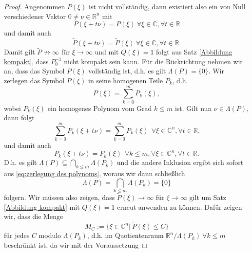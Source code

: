 \begin{proof}
Angenommen $P(\xi)$ ist nicht vollständig, dann existiert also ein von Null verschiedener Vektor $0 \not = \nu \in \mathbb{R}^n$ mit
\begin{equation}
P(\xi + t \nu)  = P(\xi) \ \forall \xi \in \mathbb{C}, \forall t \in \mathbb{R}
\end{equation}
und damit auch 
\begin{equation}
\widetilde{P}(\xi + t \nu) = \widetilde{P}(\xi) \ \forall \xi \in \mathbb{C}, \forall t \in \mathbb{R}.
\end{equation}
Damit gilt  $\widetilde{P} \not \rightarrow \infty$ für $\xi \rightarrow \infty$ und mit $Q(\xi) = 1$ folgt aus Satz \ref{Abbildung kompakt}, dass $P_0^{-1}$ nicht kompakt sein kann. Für die Rückrichtung nehmen wir an, dass das Symbol $P(\xi)$ vollständig ist, d.h. es gilt $\Lambda (P)= \{0\}$. Wir zerlegen das Symbol $P(\xi)$ in seine homogenen Teile $P_k$, d.h.
\begin{equation}\label{eq:zerlegung des polynoms}
P(\xi) = \sum_{k=0}^m P_k(\xi),
\end{equation}
wobei $P_k(\xi)$ ein homogenes Polynom vom Grad $k \leq m$ ist.
Gilt nun $\nu \in \Lambda (P)$, dann folgt
\begin{equation}
\sum_{k=0}^m P_k (\xi + t \nu) = \sum_{k=0}^m P_k (\xi) \ \  \forall \xi \in \mathbb{C}^n, \forall t \in \mathbb{R}.
\end{equation}
und damit auch
\begin{equation}
P_k (\xi + t \nu) = P_k (\xi) \ \ \forall k \leq m,  \forall \xi \in \mathbb{C}^n, \forall t \in \mathbb{R}.
\end{equation}
D.h. es gilt $\Lambda(P) \subseteq \bigcap_{k \leq m} \Lambda (P_k)$ und die andere Inklusion ergibt sich sofort aus \eqref{eq:zerlegung des polynoms}, woraus wir dann schließlich
\begin{equation}\label{eq:schnitt der homogenen teile}
\Lambda(P) = \bigcap_{k \leq m} \Lambda (P_k) = \{0\}
\end{equation}
folgern. Wir müssen also zeigen, dass $\widetilde{P}(\xi) \rightarrow \infty$ für $\xi \rightarrow \infty$ gilt um Satz \ref{Abbildung kompakt} mit $Q(\xi) =1$ erneut anwenden zu können. Dafür zeigen wir, dass die Menge
\begin{equation}
M_C := \{\xi \in \mathbb{C}^n | \ \widetilde{P}(\xi) \leq C\}
\end{equation}
für jedes $C$ modulo $\Lambda(P_k)$, d.h. im Quotientenraum $\mathbb{R}^n/{\Lambda(P_k)} \ \forall k \leq m$ beschränkt ist, da wir mit der Voraussetzung 

\end{proof}
